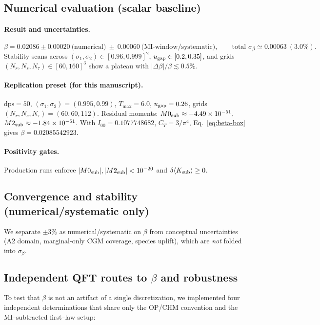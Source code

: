 \documentclass[aps,prd,onecolumn,superscriptaddress,nofootinbib]{revtex4-2}
\begin{document}
\subsection{Numerical evaluation (scalar baseline)}
\paragraph*{Result and uncertainties.}
\begin{equation}
\beta = 0.02086 \pm 0.00020\ \text{(numerical)} \ \pm\ 0.00060\ \text{(MI-window/systematic)},\qquad \text{total }\sigma_\beta \simeq 0.00063~(3.0\%).
\end{equation}
Stability scans across $(\sigma_1,\sigma_2)\in[0.96,0.999]^2$, $u_{\rm gap}\in[0.2,0.35]$, and grids $(N_r,N_s,N_\tau)\in[60,160]^3$ show a plateau with $|\Delta\beta|/\beta \lesssim 0.5\%$.

\paragraph*{Replication preset (for this manuscript).}
$\mathrm{dps}=50$, $(\sigma_1,\sigma_2)=(0.995,0.99)$, $T_{\max}=6.0$, $u_{\rm gap}=0.26$, grids $(N_r,N_s,N_\tau)=(60,60,112)$. Residual moments: $M0_{\rm sub}\approx-4.49\times 10^{-51}$, $M2_{\rm sub}\approx-1.84\times 10^{-51}$. With $I_{00}=0.1077748682$, $C_T=3/\pi^4$, Eq.~\eqref{eq:beta-box} gives $\beta=0.02085542923$.

\paragraph*{Positivity gates.}
Production runs enforce $|M0_{\rm sub}|,|M2_{\rm sub}|<10^{-20}$ and $\delta\langle K_{\rm sub}\rangle \ge 0$.

\subsection{Convergence and stability (numerical/systematic only)}
\label{sec:convergence}
We separate $\pm3\%$ as numerical/systematic on $\beta$ from conceptual uncertainties (A2 domain, marginal-only CGM coverage, species uplift), which are \emph{not} folded into $\sigma_\beta$.

\subsection{Independent QFT routes to \texorpdfstring{$\beta$}{beta} and robustness}
\label{sec:beta-multimethod}
To test that $\beta$ is not an artifact of a single discretization, we implemented four independent determinations that share only the OP/CHM convention and the MI–subtracted first–law setup:
\end{document}
